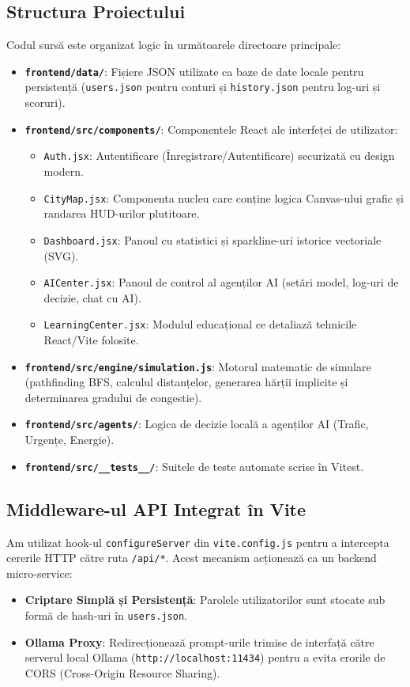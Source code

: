 \documentclass[12pt,a4paper]{article}
\begin{document}
\subsection{Structura Proiectului}
Codul sursă este organizat logic în următoarele directoare principale:
\begin{itemize}
    \item \textbf{\texttt{frontend/data/}}: Fișiere JSON utilizate ca baze de date locale pentru persistență (\texttt{users.json} pentru conturi și \texttt{history.json} pentru log-uri și scoruri).
    \item \textbf{\texttt{frontend/src/components/}}: Componentele React ale interfeței de utilizator:
    \begin{itemize}
        \item \texttt{Auth.jsx}: Autentificare (Înregistrare/Autentificare) securizată cu design modern.
        \item \texttt{CityMap.jsx}: Componenta nucleu care conține logica Canvas-ului grafic și randarea HUD-urilor plutitoare.
        \item \texttt{Dashboard.jsx}: Panoul cu statistici și sparkline-uri istorice vectoriale (SVG).
        \item \texttt{AICenter.jsx}: Panoul de control al agenților AI (setări model, log-uri de decizie, chat cu AI).
        \item \texttt{LearningCenter.jsx}: Modulul educațional ce detaliază tehnicile React/Vite folosite.
    \end{itemize}
    \item \textbf{\texttt{frontend/src/engine/simulation.js}}: Motorul matematic de simulare (pathfinding BFS, calculul distanțelor, generarea hărții implicite și determinarea gradului de congestie).
    \item \textbf{\texttt{frontend/src/agents/}}: Logica de decizie locală a agenților AI (Trafic, Urgențe, Energie).
    \item \textbf{\texttt{frontend/src/\_\_tests\_\_/}}: Suitele de teste automate scrise în Vitest.
\end{itemize}

\subsection{Middleware-ul API Integrat în Vite}
Am utilizat hook-ul \texttt{configureServer} din \texttt{vite.config.js} pentru a intercepta cererile HTTP către ruta \texttt{/api/*}. Acest mecanism acționează ca un backend micro-service:
\begin{itemize}
    \item \textbf{Criptare Simplă și Persistență}: Parolele utilizatorilor sunt stocate sub formă de hash-uri în \texttt{users.json}.
    \item \textbf{Ollama Proxy}: Redirecționează prompt-urile trimise de interfață către serverul local Ollama (\texttt{http://localhost:11434}) pentru a evita erorile de CORS (Cross-Origin Resource Sharing).
\end{itemize}
\end{document}
